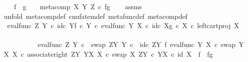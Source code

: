 \begin{isabellebody}
\ \ \ {\isachardoublequoteopen}f\ {\isasymbox}\ g\ \ \ {\isacharequal}{\kern0pt}\ meta{\isacharunderscore}{\kern0pt}comp\ X\ Y\ Z\ {\isasymcirc}\isactrlsub c\ {\isasymlangle}f{\isacharcomma}{\kern0pt}g{\isasymrangle}{\isachardoublequoteclose}\isanewline
%
\isadelimproof
\ \ %
\endisadelimproof
%
\isatagproof
{}\isamarkupfalse%
\ assms\ \isanewline
{}\isamarkupfalse%
{\isacharparenleft}{\kern0pt}unfold\ meta{\isacharunderscore}{\kern0pt}comp{}{\isacharunderscore}{\kern0pt}def{}\ cnufatem{\isacharunderscore}{\kern0pt}def{}\ metafunc{\isacharunderscore}{\kern0pt}def\ meta{\isacharunderscore}{\kern0pt}comp{\isacharunderscore}{\kern0pt}def{\isacharparenright}{\kern0pt}\ \ \ \ \ \ \ \ \ \ \isanewline
\ \ \isamarkupfalse%
\ {\isachardoublequoteopen}{\isacharparenleft}{\kern0pt}{\isacharparenleft}{\kern0pt}{\isacharparenleft}{\kern0pt}eval{\isacharunderscore}{\kern0pt}func\ Z\ Y\ {\isasymcirc}\isactrlsub c\ {\isasymlangle}id\isactrlsub c\ Y{\isacharcomma}{\kern0pt}f\ {\isasymcirc}\isactrlsub c\ {\isasymbeta}\isactrlbsub Y\isactrlesub {\isasymrangle}{\isacharparenright}{\kern0pt}\ {\isasymcirc}\isactrlsub c\ eval{\isacharunderscore}{\kern0pt}func\ Y\ X\ {\isasymcirc}\isactrlsub c\ {\isasymlangle}id\isactrlsub c\ X{\isacharcomma}{\kern0pt}g\ {\isasymcirc}\isactrlsub c\ {\isasymbeta}\isactrlbsub X\isactrlesub {\isasymrangle}{\isacharparenright}{\kern0pt}\ {\isasymcirc}\isactrlsub c\ left{\isacharunderscore}{\kern0pt}cart{\isacharunderscore}{\kern0pt}proj\ X\ {\isasymone}{\isacharparenright}{\kern0pt}\ {\isacharequal}{\kern0pt}\ \ \isanewline
\ \ \ \ \ \ \ \ \ \ {\isacharparenleft}{\kern0pt}eval{\isacharunderscore}{\kern0pt}func\ Z\ Y\ {\isasymcirc}\isactrlsub c\ \ swap\ {\isacharparenleft}{\kern0pt}Z\isactrlbsup Y\isactrlesup {\isacharparenright}{\kern0pt}\ Y\ {\isasymcirc}\isactrlsub c\ \ {\isacharparenleft}{\kern0pt}id\isactrlsub c\ {\isacharparenleft}{\kern0pt}Z\isactrlbsup Y\isactrlesup {\isacharparenright}{\kern0pt}\ {\isasymtimes}\isactrlsub f\ {\isacharparenleft}{\kern0pt}eval{\isacharunderscore}{\kern0pt}func\ Y\ X\ {\isasymcirc}\isactrlsub c\ swap\ {\isacharparenleft}{\kern0pt}Y\isactrlbsup X\isactrlesup {\isacharparenright}{\kern0pt}\ X{\isacharparenright}{\kern0pt}{\isacharparenright}{\kern0pt}\ {\isasymcirc}\isactrlsub c\ associate{\isacharunderscore}{\kern0pt}right\ {\isacharparenleft}{\kern0pt}Z\isactrlbsup Y\isactrlesup {\isacharparenright}{\kern0pt}\ {\isacharparenleft}{\kern0pt}Y\isactrlbsup X\isactrlesup {\isacharparenright}{\kern0pt}\ X\ {\isasymcirc}\isactrlsub c\ swap\ X\ {\isacharparenleft}{\kern0pt}Z\isactrlbsup Y\isactrlesup \ {\isasymtimes}\isactrlsub c\ Y\isactrlbsup X\isactrlesup {\isacharparenright}{\kern0pt}{\isacharparenright}{\kern0pt}\ {\isasymcirc}\isactrlsub c\ {\isacharparenleft}{\kern0pt}id\ {\isacharparenleft}{\kern0pt}X{\isacharparenright}{\kern0pt}\ \ {\isasymtimes}\isactrlsub f\ \ {\isasymlangle}f{\isacharcomma}{\kern0pt}g{\isasymrangle}{\isacharparenright}{\kern0pt}{\isachardoublequoteclose}\isanewline

\end{isabellebody}
